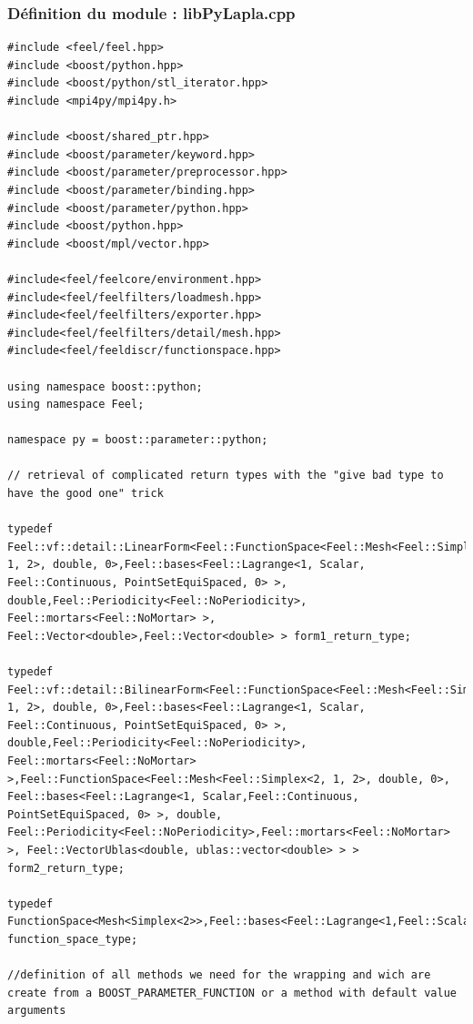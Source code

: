 \documentclass[french,12pt]{article}
\begin{document}
\subsubsection{Définition du module : libPyLapla.cpp}
\begin{lstlisting}
#include <feel/feel.hpp>
#include <boost/python.hpp>
#include <boost/python/stl_iterator.hpp>
#include <mpi4py/mpi4py.h>

#include <boost/shared_ptr.hpp>
#include <boost/parameter/keyword.hpp>
#include <boost/parameter/preprocessor.hpp>
#include <boost/parameter/binding.hpp>
#include <boost/parameter/python.hpp>
#include <boost/python.hpp>
#include <boost/mpl/vector.hpp>

#include<feel/feelcore/environment.hpp>
#include<feel/feelfilters/loadmesh.hpp>
#include<feel/feelfilters/exporter.hpp>
#include<feel/feelfilters/detail/mesh.hpp>
#include<feel/feeldiscr/functionspace.hpp>

using namespace boost::python;
using namespace Feel;

namespace py = boost::parameter::python;

// retrieval of complicated return types with the "give bad type to have the good one" trick 

typedef Feel::vf::detail::LinearForm<Feel::FunctionSpace<Feel::Mesh<Feel::Simplex<2, 1, 2>, double, 0>,Feel::bases<Feel::Lagrange<1, Scalar, Feel::Continuous, PointSetEquiSpaced, 0> >, double,Feel::Periodicity<Feel::NoPeriodicity>, Feel::mortars<Feel::NoMortar> >, Feel::Vector<double>,Feel::Vector<double> > form1_return_type;

typedef Feel::vf::detail::BilinearForm<Feel::FunctionSpace<Feel::Mesh<Feel::Simplex<2, 1, 2>, double, 0>,Feel::bases<Feel::Lagrange<1, Scalar, Feel::Continuous, PointSetEquiSpaced, 0> >, double,Feel::Periodicity<Feel::NoPeriodicity>, Feel::mortars<Feel::NoMortar> >,Feel::FunctionSpace<Feel::Mesh<Feel::Simplex<2, 1, 2>, double, 0>, Feel::bases<Feel::Lagrange<1, Scalar,Feel::Continuous, PointSetEquiSpaced, 0> >, double, Feel::Periodicity<Feel::NoPeriodicity>,Feel::mortars<Feel::NoMortar> >, Feel::VectorUblas<double, ublas::vector<double> > > form2_return_type;

typedef FunctionSpace<Mesh<Simplex<2>>,Feel::bases<Feel::Lagrange<1,Feel::Scalar,Feel::Continuous,Feel::PointSetEquiSpaced,0>>,double,Feel::Periodicity<Feel::NoPeriodicity>,Feel::mortars<Feel::NoMortar>> function_space_type;

//definition of all methods we need for the wrapping and wich are create from a BOOST_PARAMETER_FUNCTION or a method with default value arguments  


\end{lstlisting}
\end{document}
